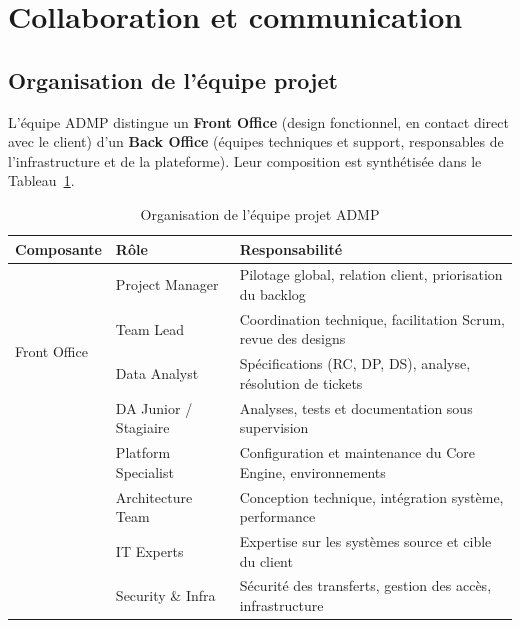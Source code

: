 \section{Collaboration et communication}
\label{sec:collaboration}

\subsection{Organisation de l'équipe projet}
\label{subsec:organisation-equipe}

L'équipe ADMP distingue un \textbf{Front Office} (design fonctionnel, en contact direct avec le client) d'un \textbf{Back Office} (équipes techniques et support, responsables de l'infrastructure et de la plateforme). Leur composition est synthétisée dans le Tableau~\ref{tab:equipe}.

\begin{table}[H]
\centering
\caption{Organisation de l'équipe projet ADMP}
\label{tab:equipe}
\begin{tabularx}{\textwidth}{llX}
\toprule
\textbf{Composante} & \textbf{Rôle} & \textbf{Responsabilité} \\
\midrule
\multirow{4}{*}{Front Office}
  & Project Manager & Pilotage global, relation client, priorisation du backlog \\
  & Team Lead & Coordination technique, facilitation Scrum, revue des designs \\
  & Data Analyst & Spécifications (RC, DP, DS), analyse, résolution de tickets \\
  & DA Junior / Stagiaire & Analyses, tests et documentation sous supervision \\
\addlinespace
\multirow{4}{*}{Back Office}
  & Platform Specialist & Configuration et maintenance du Core Engine, environnements \\
  & Architecture Team & Conception technique, intégration système, performance \\
  & IT Experts & Expertise sur les systèmes source et cible du client \\
  & Security \& Infra & Sécurité des transferts, gestion des accès, infrastructure \\
\bottomrule
\end{tabularx}
\end{table}

